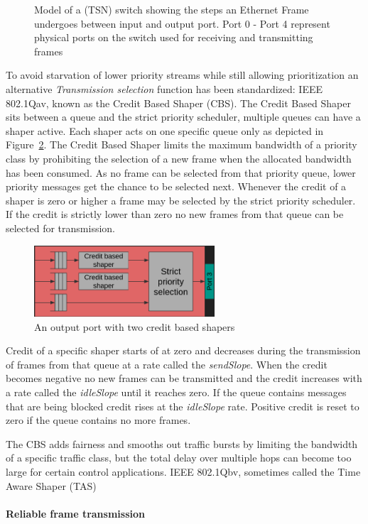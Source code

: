 \begin{figure}[htb]
	\caption{Model of a (TSN) switch showing the steps an Ethernet Frame undergoes between input and output port. Port 0 - Port 4 represent physical ports on the switch used for receiving and transmitting frames}
	\label{fig:switchinternals}
\end{figure} 
To avoid starvation of lower priority streams while still allowing prioritization an alternative \textit{Transmission selection} function has been standardized: IEEE 802.1Qav, known as the Credit Based Shaper (CBS). The Credit Based Shaper sits between a queue and the strict priority scheduler, multiple queues can have a shaper active. Each shaper acts on one specific queue only as depicted in Figure~\ref{fig:cbs}. The Credit Based Shaper limits the maximum bandwidth of a priority class by prohibiting the selection of a new frame when the allocated bandwidth has been consumed. As no frame can be selected from that priority queue, lower priority messages get the chance to be selected next. Whenever the credit of a shaper is zero or higher a frame may be selected by the strict priority scheduler. If the credit is strictly lower than zero no new frames from that queue can be selected for transmission. 
\begin{figure}[htb]
    \centering
    \includegraphics[width=0.6\textwidth]{images/cbs.png}
    \caption{An output port with two credit based shapers}
    \label{fig:cbs}
\end{figure}

Credit of a specific shaper starts of at zero and decreases during the transmission of frames from that queue at a rate called the \textit{sendSlope}. When the credit becomes negative no new frames can be transmitted and the credit increases with a rate called the \textit{idleSlope} until it reaches zero. If the queue contains messages that are being blocked credit rises at the \textit{idleSlope} rate. Positive credit is reset to zero if the queue contains no more frames.

The CBS adds fairness and smooths out traffic bursts by limiting the bandwidth of a specific traffic class, but the total delay over multiple hops can become too large for certain control applications. IEEE 802.1Qbv, sometimes called the Time Aware Shaper (TAS)

\paragraph{Reliable frame transmission}
\vfill